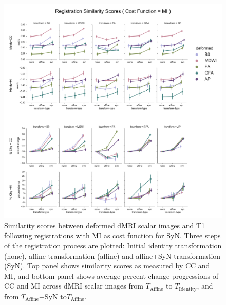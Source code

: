 {    \begin{figure}[p]
    \includegraphics[width=\linewidth]{sup1}
    \caption{Similarity scores between deformed dMRI scalar images and T1 following registrations with MI as cost function for SyN. 
    Three steps of the registration process are plotted: Initial identity transformation (none), affine transformation (affine) and affine+SyN transformation (SyN).
    Top panel shows similarity scores as measured by CC and MI, and bottom panel shows average percent change progressions of CC and MI across dMRI scalar images from \protect $T_{\text{Affine}}$ to \protect $T_{\text{Identity}}$, and from \protect $T_{\text{Affine}}$+SyN to\protect  $T_{\text{Affine}}$.}
    \centering
    \label{fig:APSup1}
    \end{figure}

    \clearpage
    
}
